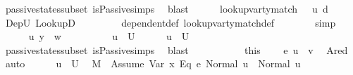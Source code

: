 \begin{isabellebody}
\ passive{\isacharunderscore}{\kern0pt}states{\isacharunderscore}{\kern0pt}subset\ isPassive{\isachardot}{\kern0pt}simps\ \isamarkupfalse%
\ blast\isanewline
\ \ \ \ \isamarkupfalse%
\ {\isachardoublequoteopen}lookup{\isacharunderscore}{\kern0pt}var{\isacharunderscore}{\kern0pt}ty{\isacharunderscore}{\kern0pt}match\ {\isasymLambda}\ {\isasymOmega}\ u{\isacharprime}{\kern0pt}\ d\ {\isasymtau}{\isachardoublequoteclose}\ \isamarkupfalse%
\ DepU\ LookupD\ \isanewline
\ \ \ \ \ \ \isamarkupfalse%
\ dependent{\isacharunderscore}{\kern0pt}def\ lookup{\isacharunderscore}{\kern0pt}var{\isacharunderscore}{\kern0pt}ty{\isacharunderscore}{\kern0pt}match{\isacharunderscore}{\kern0pt}def\isanewline
\ \ \ \ \ \ \isamarkupfalse%
\ simp\isanewline
\ \ \isamarkupfalse%
\isanewline
\ \ \ \ \isamarkupfalse%
\ u{\isacharprime}{\kern0pt}\ y\ {\isasymtau}\ w\ \ \ \ \isanewline
\ \ \ \ \isamarkupfalse%
\ {\isachardoublequoteopen}u{\isacharprime}{\kern0pt}\ {\isasymin}\ {\isacharquery}{\kern0pt}U{\isacharprime}{\kern0pt}{\isachardoublequoteclose}\isanewline
\ \ \ \ \isamarkupfalse%
\ {\isachardoublequoteopen}u{\isacharprime}{\kern0pt}\ {\isasymin}\ U{\isachardoublequoteclose}\ \isamarkupfalse%
\ passive{\isacharunderscore}{\kern0pt}states{\isacharunderscore}{\kern0pt}subset\ isPassive{\isachardot}{\kern0pt}simps\ \isamarkupfalse%
\ blast\ \ \ \ \ \isanewline
\ \ \ \ \isamarkupfalse%
\ this\ \isamarkupfalse%
\ {\isachardoublequoteopen}{\isasymLambda}{\isacharcomma}{\kern0pt}{\isasymGamma}{\isacharcomma}{\kern0pt}{\isasymOmega}\ {\isasymturnstile}\ {\isasymlangle}e{}{\isacharcomma}{\kern0pt}\ u{\isacharprime}{\kern0pt}{\isasymrangle}\ {\isasymDown}\ v{\isachardoublequoteclose}\ \isamarkupfalse%
\ Ared\ \isamarkupfalse%
\ auto\isanewline
\ \ \ \ \isamarkupfalse%
\ {\isacartoucheopen}u{\isacharprime}{\kern0pt}\ {\isasymin}\ {\isacharquery}{\kern0pt}U{\isacharprime}{\kern0pt}{\isacartoucheclose}\ \isamarkupfalse%
\ {\isachardoublequoteopen}M{\isacharcomma}{\kern0pt}{\isasymLambda}{\isacharcomma}{\kern0pt}{\isasymGamma}{\isacharcomma}{\kern0pt}{\isasymOmega}\ {\isasymturnstile}\ {\isasymlangle}Assume\ {\isacharparenleft}{\kern0pt}Var\ x\ {\isasymguillemotleft}Eq{\isasymguillemotright}\ e{}{\isacharparenright}{\kern0pt}{\isacharcomma}{\kern0pt}\ Normal\ u{\isacharprime}{\kern0pt}{\isasymrangle}\ {\isasymrightarrow}\ Normal\ u{\isacharprime}{\kern0pt}{\isachardoublequoteclose}\isanewline

\end{isabellebody}
